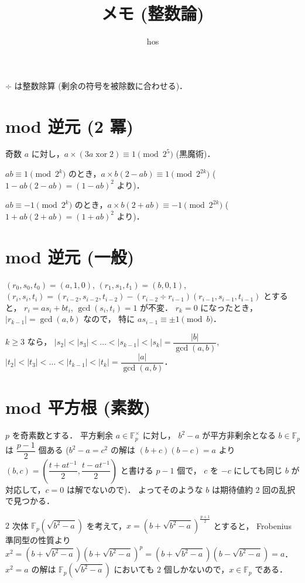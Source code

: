 \documentclass{jsarticle}
\title{メモ (整数論)}
\author{hos}
\DeclareMathOperator{\xor}{xor}
\newcommand{\F}{\mathbb{F}}
\begin{document}
\maketitle

$\div$ は整数除算 (剰余の符号を被除数に合わせる)．


\section{mod 逆元 (2 冪)}
奇数 $a$ に対し，$a \times (3a \xor 2) \equiv 1 \pmod{2^5}$ (黒魔術)．

$a b \equiv 1 \pmod{2^k}$ のとき，$a \times b (2 - a b) \equiv 1 \pmod{2^{2k}}$ ($1 - a b (2 - a b) = (1 - a b)^2$ より)．

$a b \equiv -1 \pmod{2^k}$ のとき，$a \times b (2 + a b) \equiv -1 \pmod{2^{2k}}$ ($1 + a b (2 + a b) = (1 + a b)^2$ より)．


\section{mod 逆元 (一般)}
$(r_0, s_0, t_0) = (a, 1, 0)$, 
$(r_1, s_1, t_1) = (b, 0, 1)$, 
$(r_i, s_i, t_i) = (r_{i-2}, s_{i-2}, t_{i-2}) - (r_{i-2} \div r_{i-1}) (r_{i-1}, s_{i-1}, t_{i-1})$ とすると，
$r_i = a s_i + b t_i$, $\gcd(s_i, t_i) = 1$ が不変．
$r_k = 0$ になったとき，$\lvert r_{k-1} \rvert = \gcd(a, b)$ なので，
特に $a s_{i-1} \equiv \pm 1 \pmod{b}$．

$k \ge 3$ なら，
$|s_2| < |s_3| < \dots < |s_{k-1}| < |s_k| = \dfrac{\lvert b \rvert}{\gcd(a, b)}$, 
$|t_2| < |t_3| < \dots < |t_{k-1}| < |t_k| = \dfrac{\lvert a \rvert}{\gcd(a, b)}$．


\section{mod 平方根 (素数)}
$p$ を奇素数とする．
平方剰余 $a \in \F_p^\times$ に対し，
$b^2 - a$ が平方非剰余となる $b \in \F_p$ は $\dfrac{p - 1}{2}$ 個ある ($b^2 - a = c^2$ の解は
$(b + c) (b - c) = a$ より $(b, c) = \left(\dfrac{t + a t^{-1}}{2}, \dfrac{t - a t^{-1}}{2}\right)$ と書ける $p - 1$ 個で，
$c$ を $-c$ にしても同じ $b$ が対応して，$c = 0$ は解でないので)．
よってそのような $b$ は期待値約 $2$ 回の乱択で見つかる．

$2$ 次体 $\F_p(\sqrt{b^2 - a})$ を考えて，$x = \left(b + \sqrt{b^2 - a}\right)^{\frac{p+1}{2}}$ とすると，
Frobenius 準同型の性質より $x^2 = \left(b + \sqrt{b^2 - a}\right) \left(b + \sqrt{b^2 - a}\right)^p = \left(b + \sqrt{b^2 - a}\right) \left(b - \sqrt{b^2 - a}\right) = a$．
$x^2 = a$ の解は $\F_p(\sqrt{b^2 - a})$ においても $2$ 個しかないので，$x \in \F_p$ である．
\end{document}
